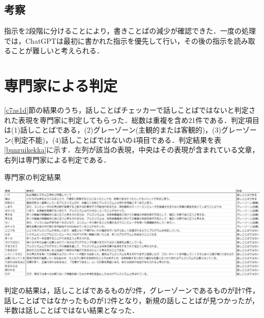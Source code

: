 \subsection{考察}
指示を2段階に分けることにより，書きことばの減少が確認できた．一度の処理では，ChatGPTは最初に書かれた指示を優先して行い，その後の指示を読み取ることが難しいと考えられる．

\section{専門家による判定}
\ref{c7as1d}節の結果のうち，話しことばチェッカーで話しことばではないと判定された表現を専門家に判定してもらった．総数は重複を含め21件である．判定項目は(1)話しことばである，(2)グレーゾーン(主観的または客観的)，(3)グレーゾーン(判定不能)，(4)話しことばではないの4項目である．判定結果を表\ref{bunruikekka}に示す．左列が該当の表現，中央はその表現が含まれている文章，右列は専門家による判定である．

\begin{table}[H]
	\centering
        \caption{専門家の判定結果}
 	\includegraphics[width=150mm]{image/result-bunruikekka.png}
	\label{bunruikekka}
\end{table}

判定の結果は，話しことばであるものが2件，グレーゾーンであるものが計7件，話しことばではなかったものが12件となり，新規の話しことばが見つかったが，半数は話しことばではない結果となった．